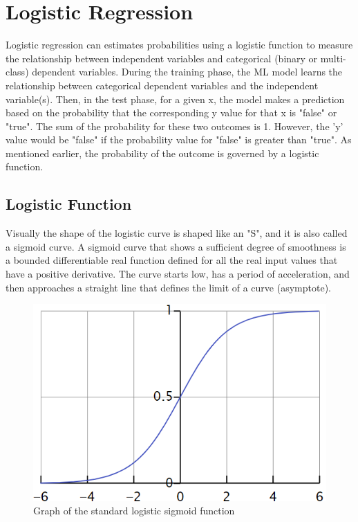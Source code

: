 \documentclass[conference]{IEEEtran}
\begin{document}
\section{Logistic Regression}
Logistic regression can estimates probabilities using a logistic function to measure the relationship between independent variables and categorical (binary or multi-class) dependent variables. During the training phase, the ML model learns the relationship between categorical dependent variables and the independent variable(s). Then, in the test phase, for a given x, the model makes a prediction based on the probability that the corresponding y value for that x is "false" or "true". The sum of the
probability for these two outcomes is 1. However, the 'y' value would be "false" if the probability value for "false" is greater than "true". As mentioned earlier, the probability of the outcome is governed by a logistic function.

\subsection{Logistic Function}
Visually the shape of the logistic curve is shaped like an "S", and it is also called a sigmoid curve.
A sigmoid curve that shows a sufficient degree of smoothness is a bounded differentiable real function defined for all the real input values that have a positive derivative\cite{bb7}. The curve starts low, has a period of acceleration, and then approaches a straight line that defines the limit of a curve (asymptote).

\begin{figure}[h]
    \centering
    \includegraphics[scale=0.62]{figs/Lfunction.png}
    \caption{Graph of the standard logistic sigmoid function \cite{img}}
    \label{dabc}        
\end{figure}
\end{document}

